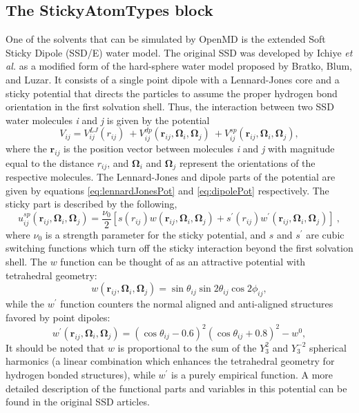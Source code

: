 \documentclass[]{book}
\begin{document}
\subsection{\label{section:ffSticky}The StickyAtomTypes block}

One of the solvents that can be simulated by {\sc OpenMD} is the
extended Soft Sticky Dipole (SSD/E) water model.\cite{fennell04} The
original SSD was developed by Ichiye \emph{et
  al.}\cite{liu96:new_model} as a modified form of the hard-sphere
water model proposed by Bratko, Blum, and
Luzar.\cite{Bratko85,Bratko95} It consists of a single point dipole
with a Lennard-Jones core and a sticky potential that directs the
particles to assume the proper hydrogen bond orientation in the first
solvation shell. Thus, the interaction between two SSD water molecules
\emph{i} and \emph{j} is given by the potential
\begin{equation}
V_{ij} = 
	V_{ij}^{LJ} (r_{ij})\ + V_{ij}^{dp}
	(\mathbf{r}_{ij},\mathbf{\Omega}_i,\mathbf{\Omega}_j)\ +
	V_{ij}^{sp}
	(\mathbf{r}_{ij},\mathbf{\Omega}_i,\mathbf{\Omega}_j),
\label{eq:ssdPot}
\end{equation}
where the $\mathbf{r}_{ij}$ is the position vector between molecules
\emph{i} and \emph{j} with magnitude equal to the distance $r_{ij}$, and
$\mathbf{\Omega}_i$ and $\mathbf{\Omega}_j$ represent the
orientations of the respective molecules. The Lennard-Jones and dipole
parts of the potential are given by equations \ref{eq:lennardJonesPot}
and \ref{eq:dipolePot} respectively. The sticky part is described by
the following,
\begin{equation}
u_{ij}^{sp}(\mathbf{r}_{ij},\mathbf{\Omega}_i,\mathbf{\Omega}_j)=
	\frac{\nu_0}{2}[s(r_{ij})w(\mathbf{r}_{ij},
	\mathbf{\Omega}_i,\mathbf{\Omega}_j) +
	s^\prime(r_{ij})w^\prime(\mathbf{r}_{ij},
	\mathbf{\Omega}_i,\mathbf{\Omega}_j)]\ ,
\label{eq:stickyPot}
\end{equation}
where $\nu_0$ is a strength parameter for the sticky potential, and
$s$ and $s^\prime$ are cubic switching functions which turn off the
sticky interaction beyond the first solvation shell. The $w$ function
can be thought of as an attractive potential with tetrahedral
geometry:
\begin{equation}
w(\mathbf{r}_{ij},\mathbf{\Omega}_i,\mathbf{\Omega}_j)=
	\sin\theta_{ij}\sin2\theta_{ij}\cos2\phi_{ij},
\label{eq:stickyW}
\end{equation}
while the $w^\prime$ function counters the normal aligned and
anti-aligned structures favored by point dipoles:
\begin{equation}
w^\prime(\mathbf{r}_{ij},\mathbf{\Omega}_i,\mathbf{\Omega}_j)=
	(\cos\theta_{ij}-0.6)^2(\cos\theta_{ij}+0.8)^2-w^0,
\label{eq:stickyWprime}
\end{equation}
It should be noted that $w$ is proportional to the sum of the $Y_3^2$
and $Y_3^{-2}$ spherical harmonics (a linear combination which
enhances the tetrahedral geometry for hydrogen bonded structures),
while $w^\prime$ is a purely empirical function.  A more detailed
description of the functional parts and variables in this potential
can be found in the original SSD
articles.\cite{liu96:new_model,liu96:monte_carlo,chandra99:ssd_md,Ichiye03}
\end{document}
